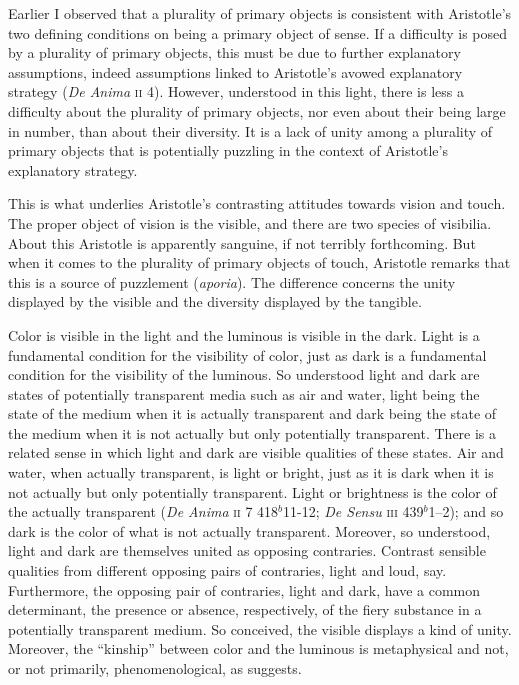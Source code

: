 Earlier I observed that a plurality of primary objects is consistent with Aristotle's two defining conditions on being a primary object of sense. If a difficulty is posed by a plurality of primary objects, this must be due to further explanatory assumptions, indeed assumptions linked to Aristotle's avowed explanatory strategy (\emph{De Anima} \textsc{ii} 4). However, understood in this light, there is less a difficulty about the plurality of primary objects, nor even about their being large in number, than about their diversity. It is a lack of unity among a plurality of primary objects that is potentially puzzling in the context of Aristotle's explanatory strategy. 

This is what underlies Aristotle's contrasting attitudes towards vision and touch. The proper object of vision is the visible, and there are two species of visibilia. About this Aristotle is apparently sanguine, if not terribly forthcoming. But when it comes to the plurality of primary objects of touch, Aristotle remarks that this is a source of puzzlement (\emph{aporia}). The difference concerns the unity displayed by the visible and the diversity displayed by the tangible.

Color is visible in the light and the luminous is visible in the dark. Light is a fundamental condition for the visibility of color, just as dark is a fundamental condition for the visibility of the luminous. So understood light and dark are states of potentially transparent media such as air and water, light being the state of the medium when it is actually transparent and dark being the state of the medium when it is not actually but only potentially transparent. There is a related sense in which light and dark are visible qualities of these states. Air and water, when actually transparent, is light or bright, just as it is dark when it is not actually but only potentially transparent. Light or brightness is the color of the actually transparent (\emph{De Anima} \textsc{ii} 7 418\( ^{b} \)11-12; \emph{De Sensu} \textsc{iii} 439\( ^{b} \)1--2); and so dark is the color of what is not actually transparent. Moreover, so understood, light and dark are themselves united as opposing contraries. Contrast sensible qualities from different opposing pairs of contraries, light and loud, say. Furthermore, the opposing pair of contraries, light and dark, have a common determinant, the presence or absence, respectively, of the fiery substance in a potentially transparent medium. So conceived, the visible displays a kind of unity. Moreover, the ``kinship'' between color and the luminous is metaphysical and not, or not primarily, phenomenological, as \citet[63]{Sorabji:1971fr} suggests.

